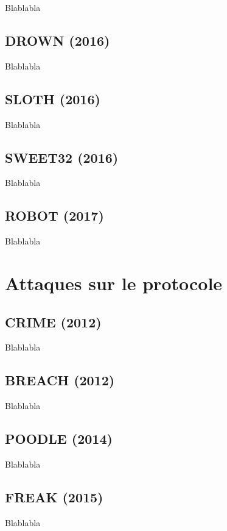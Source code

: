 Blablabla \cite{logjam}

\subsection{DROWN (2016)}

Blablabla \cite{drown}

\subsection{SLOTH (2016)}

Blablabla \cite{sloth}

\subsection{SWEET32 (2016)}

Blablabla \cite{sweet32}

\subsection{ROBOT (2017)}

Blablabla \cite{robot}

\section{Attaques sur le protocole}

\subsection{CRIME (2012)}

Blablabla \cite{crime}

\subsection{BREACH (2012)}

Blablabla \cite{breach}

\subsection{POODLE (2014)}

Blablabla \cite{poodle}

\subsection{FREAK (2015)}

Blablabla \cite{freak}

